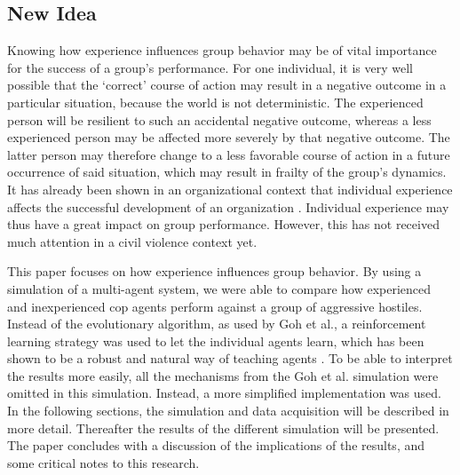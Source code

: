 \subsection{New Idea}
Knowing how experience influences group behavior may be of vital importance for the success of a group's performance.
For one individual, it is very well possible that the `correct' course of action may result in a negative outcome in a particular situation, because the world is not deterministic.
The experienced person will be resilient to such an accidental negative outcome, whereas a less experienced person may be affected more severely by that negative outcome.
The latter person may therefore change to a less favorable course of action in a future occurrence of said situation, which may result in frailty of the group's dynamics.
It has already been shown in an organizational context that individual experience affects the successful development of an organization \citep*{reagans2005individual}.
Individual experience may thus have a great impact on group performance.
However, this has not received much attention in a civil violence context yet.

This paper focuses on how experience influences group behavior.
 By using a simulation of a multi-agent system, we were able to compare how experienced and inexperienced cop agents perform against a group of aggressive hostiles. Instead of the evolutionary algorithm, as used by Goh et al., a reinforcement learning strategy was used to let the individual agents learn, which has been shown to be a robust and natural way of teaching agents \citep{claus1998dynamics}. To be able to interpret the results more easily, all the mechanisms from the Goh et al. simulation were omitted in this simulation. Instead, a more simplified implementation was used. In the following sections, the simulation and data acquisition will be described in more detail.
 Thereafter the results of the different simulation will be presented.
 The paper concludes with a discussion of the implications of the results, and some critical notes to this research.
 
